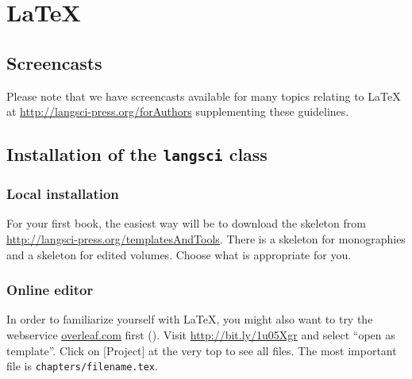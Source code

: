 \chapter{\LaTeX}

\section{Screencasts}
Please note that we have screencasts available for many topics relating to {\LaTeX} at \url{http://langsci-press.org/forAuthors} supplementing these guidelines.

\section{Installation of the \texttt{langsci} class}
\subsection{Local installation}
For your first book, the easiest way will be to download the skeleton from \url{http://langsci-press.org/templatesAndTools}.
There is a skeleton for monographies and a skeleton for edited volumes. Choose what is appropriate for you.
 


\subsection{Online editor}
In order to familiarize yourself with \LaTeX, you might also want to try the webservice \url{overleaf.com} first (). Visit \url{http://bit.ly/1u05Xgr} and select ``open as template''. Click on [Project] at the very top to see all files. The most important file is \verb+chapters/filename.tex+.


